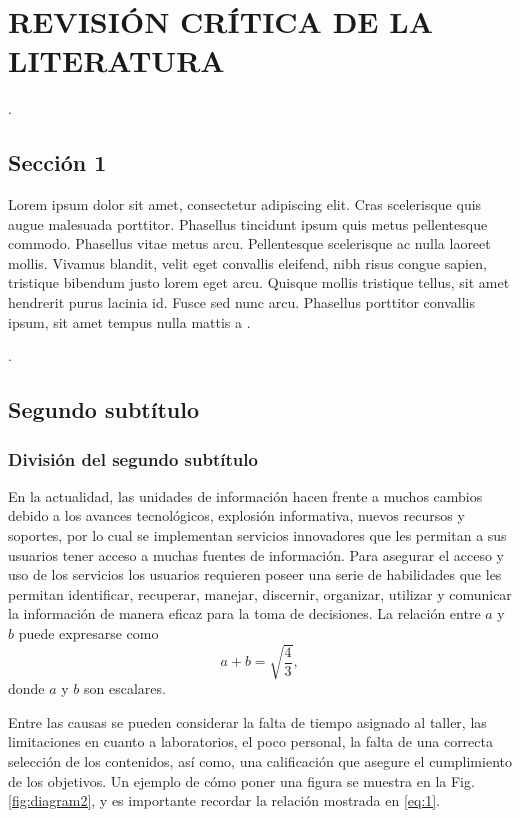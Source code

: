 \chapter{REVISIÓN CRÍTICA DE LA LITERATURA}

.

\section{Sección 1}

Lorem ipsum dolor sit amet, consectetur adipiscing elit. Cras scelerisque quis augue malesuada porttitor. Phasellus tincidunt ipsum quis metus pellentesque commodo. Phasellus vitae metus arcu. Pellentesque scelerisque ac nulla laoreet mollis. Vivamus blandit, velit eget convallis eleifend, nibh risus congue sapien, tristique bibendum justo lorem eget arcu. Quisque mollis tristique tellus, sit amet hendrerit purus lacinia id. Fusce sed nunc arcu. Phasellus porttitor convallis ipsum, sit amet tempus nulla mattis a \cite{Reumann2012}.

.

\section{Segundo subtítulo}

\subsection{División del segundo subtítulo}

En la actualidad, las unidades de información hacen frente a muchos cambios
debido a los avances tecnológicos, explosión informativa, nuevos recursos y
soportes, por lo cual se implementan servicios innovadores que les permitan a
sus usuarios tener acceso a muchas fuentes de información. Para asegurar el
acceso y uso de los servicios los usuarios requieren poseer una serie de
habilidades que les permitan identificar, recuperar, manejar, discernir,
organizar, utilizar y comunicar la información de manera eficaz para la toma de
decisiones. La relación entre $a$ y $b$ puede expresarse como
%
\begin{equation}
  \label{eq:1}
  a+b=\sqrt{\frac{4}{3}},
\end{equation}
%
donde $a$ y $b$ son escalares.

Entre las causas se pueden considerar la falta de tiempo asignado al taller,
las limitaciones en cuanto a laboratorios, el poco personal, la falta de una
correcta selección de los contenidos, así como, una calificación que asegure el
cumplimiento de los objetivos. Un ejemplo de cómo poner una figura se muestra en la Fig. \ref{fig:diagram2}, y es importante recordar la relación mostrada en \eqref{eq:1}.


